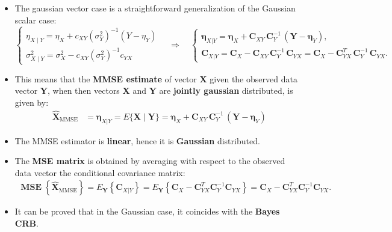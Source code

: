 \begin{itemize}
\item The gaussian vector case is a straightforward generalization of the Gaussian scalar case:
\[
\begin{cases}
    \eta_{X\mid Y}=\eta_X+c_{XY}(\sigma_Y^2)^{-1}(Y-\eta_Y)\\[6pt]
    \sigma_{X\mid Y}^2=\sigma_X^2-c_{XY}(\sigma^2_Y)^{-1}c_{YX}
\end{cases}\quad\Longrightarrow\quad
\begin{cases}
\boldsymbol{\eta}_{X|Y}
= \boldsymbol{\eta}_X
   + \mathbf{C}_{XY}\,\mathbf{C}_Y^{-1}\,(\mathbf{Y}-\boldsymbol{\eta}_Y), \\[6pt]
\mathbf{C}_{X|Y}
= \mathbf{C}_X - \mathbf{C}_{XY}\,\mathbf{C}_Y^{-1}\,\mathbf{C}_{YX}
 = \mathbf{C}_X - \mathbf{C}_{YX}^{T}\,\mathbf{C}_Y^{-1}\,\mathbf{C}_{YX}.
\end{cases}
\]

\item This means that the \textbf{MMSE estimate} of vector \textbf{X} given the observed data vector \textbf{Y}, when then vectors \textbf{X} and \textbf{Y} are \textbf{jointly gaussian} distributed, is given by:
\begin{align*}
\hat{\mathbf{X}}_{\text{MMSE}}
&= \boldsymbol{\eta}_{X|Y}
 = E\{\mathbf{X}\mid\mathbf{Y}\}
 = \boldsymbol{\eta}_X
   + \mathbf{C}_{XY}\,\mathbf{C}_Y^{-1}\,(\mathbf{Y}-\boldsymbol{\eta}_Y)
\end{align*}
\item The MMSE estimator is \textbf{linear}, hence it is \textbf{Gaussian} distributed.
\item The \textbf{MSE matrix} is obtained by averaging with respect to the observed data vector the conditional covariance matrix:
\begin{align*}
\operatorname{\mathbf{MSE}}\!\left\{\hat{\mathbf{X}}_{\text{MMSE}}\right\}= E_{\mathbf{Y}}\!\left\{\mathbf{C}_{X|Y}\right\}= E_{\mathbf{Y}}\!\left\{\mathbf{C}_X
      - \mathbf{C}_{YX}^{T}\mathbf{C}_Y^{-1}\mathbf{C}_{YX}\right\}= \mathbf{C}_X - \mathbf{C}_{YX}^{T}\mathbf{C}_Y^{-1}\mathbf{C}_{YX}.
\end{align*}
\item It can be proved that in the Gaussian case, it coincides with the \textbf{Bayes CRB}.
\end{itemize}
